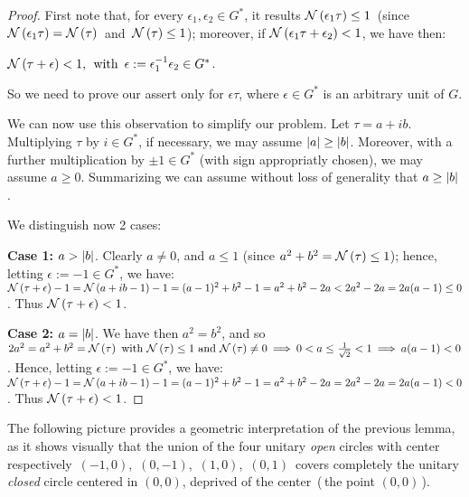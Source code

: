 \begin{proof}
%
First note that, for every $\epsilon_1, \epsilon_2
\in G^\ast$, it results \;$\mathcal{N}\left(\epsilon_1\tau\right) \leq 1$\,
(since $\mathcal{N}\left(\epsilon_1\tau\right) = \mathcal{N}\left(\tau\right)$\, and\,
$\mathcal{N}\left(\tau\right) \leq 1$);\; moreover, if
$\mathcal{N}\left(\epsilon_1\tau + \epsilon_2\right) < 1$, we have then:

$\mathcal{N}\left(\tau + \epsilon\right) < 1 \textrm{,\; with \,} \epsilon:=
\epsilon_1^{-1}\epsilon_2 \in G^\ast$.

So we need to prove our assert only for $\epsilon\tau$,
where $\epsilon \in G^\ast$ is an arbitrary unit of $G$.

We can now use this observation to simplify our problem.
Let $\tau = a + ib$. Multiplying $\tau$ by $i\in G^\ast$,
if necessary, we may assume $\left|a\right| \geq \left|b\right|$. Moreover,
with a further multiplication by $\pm 1 \in G^\ast$ (with sign
appropriatly chosen), we may assume $ a \geq 0 $.
Summarizing we can assume without loss of generality that
$a \geq \left|b\right|$.

We distinguish now 2 cases:

\smallskip

\textbf{Case 1:} $a > \left|b\right|$. Clearly $a \not= 0$, and
$a \leq 1$ (since $a^2 + b^2 = \mathcal{N}\left(\tau\right) \leq 1$); hence,
letting $\epsilon:= -1 \in G^\ast$, we have:\,
$\mathcal{N}\left(\tau + \epsilon\right) -1 = \mathcal{N}\left(a + ib - 1\right) - 1 =
(a - 1)^2 + b^2 - 1 = a^2 + b^2 - 2a < 2a^2 - 2a =
2a(a - 1)\leq 0$.
Thus $\mathcal{N}\left(\tau + \epsilon\right) < 1$.

\smallskip

\textbf{Case 2:} $a = \left|b\right|$. We have then $a^2 = b^2$,
and so $2a^2 = a^2 + b^2 = \mathcal{N}\left(\tau\right) \textrm{ with }
\mathcal{N}\left(\tau\right) \leq 1 \textrm{ and } \mathcal{N}\left(\tau\right) \not= 0
\:\Longrightarrow\: 0 < a \leq \frac{1}{\sqrt 2} < 1 \:\Longrightarrow\: a(a - 1) < 0$.
Hence, letting $\epsilon:= -1 \in G^\ast$, we have:\,
$\mathcal{N}\left(\tau + \epsilon\right) -1 = \mathcal{N}\left(a + ib - 1\right) - 1 =
(a - 1)^2 + b^2 - 1 = a^2 + b^2 - 2a = 2a^2 - 2a =
2a(a - 1) < 0$. Thus $\mathcal{N}\left(\tau + \epsilon\right) < 1$.
% 
\end{proof}

\medskip
The following picture provides a geometric interpretation of the
previous lemma, as it shows visually that the union of the four
unitary \emph{open\/} circles with center respectively
\,\mbox{$(-1,0)$, $(0,-1)$, $(1,0)$, $(0,1)$}\,
covers completely the unitary \emph{closed\/} circle centered
in $(0,0)$, deprived of the center \,(\,\ie the point $(0,0)$\,).

